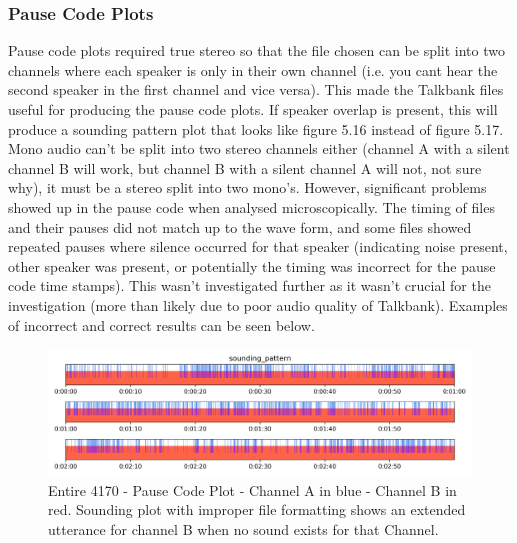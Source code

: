 
\subsubsection{Pause Code Plots}
Pause code plots required true stereo so that the file chosen can be split into two channels where each speaker is only in their own channel (i.e. you cant hear the second speaker in the first channel and vice versa). This made the Talkbank files useful for producing the pause code plots. If speaker overlap is present, this will produce a sounding pattern plot that looks like figure 5.16 instead of figure 5.17. \\

Mono audio can't be split into two stereo channels either (channel A with a silent channel B will work, but channel B with a silent channel A will not, not sure why), it must be a stereo split into two mono's. However, significant problems showed up in the pause code when analysed microscopically. The timing of files and their pauses did not match up to the wave form, and some files showed repeated pauses where silence occurred for that speaker (indicating noise present, other speaker was present, or potentially the timing was incorrect for the pause code time stamps). This wasn't investigated further as it wasn't crucial for the investigation (more than likely due to poor audio quality of Talkbank). Examples of incorrect and correct results can be seen below. \\  

\begin{figure}[h!]
	\centerline{\includegraphics[scale=0.5]{src/main-matter/methodology/preliminary-testing/4170/sounding_pattern_plot_4170_stereo_split}}

	\caption{Entire 4170 - Pause Code Plot - Channel A in blue - Channel B in red. Sounding plot with improper file formatting shows an extended utterance for channel B when no sound exists for that Channel.}
	\label{fig:overlap-sounding}
\end{figure}

